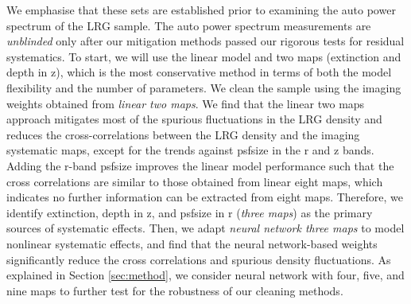  We emphasise that these sets are established prior to examining the auto power spectrum of the LRG sample. The auto power spectrum measurements are \textit{unblinded} only after our mitigation methods passed our rigorous tests for residual systematics. To start, we will use the linear model and two maps (extinction and depth in z), which is the most conservative method in terms of both the model flexibility and the number of parameters. We clean the sample using the imaging weights obtained from \textit{linear two maps}. We find that the linear two maps approach mitigates most of the spurious fluctuations in the LRG density and reduces the cross-correlations between the LRG density and the imaging systematic maps, except for the trends against psfsize in the r and z bands. Adding the r-band psfsize improves the linear model performance such that the cross correlations are similar to those obtained from linear eight maps, which indicates no further information can be extracted from eight maps. Therefore, we identify extinction, depth in z, and psfsize in r (\textit{three maps}) as the primary sources of systematic effects. Then, we adapt \textit{neural network three maps} to model nonlinear systematic effects, and find that the neural network-based weights significantly reduce the cross correlations and spurious density fluctuations. As explained in Section \ref{sec:method}, we consider neural network with four, five, and nine maps to further test for the robustness of our cleaning methods.



